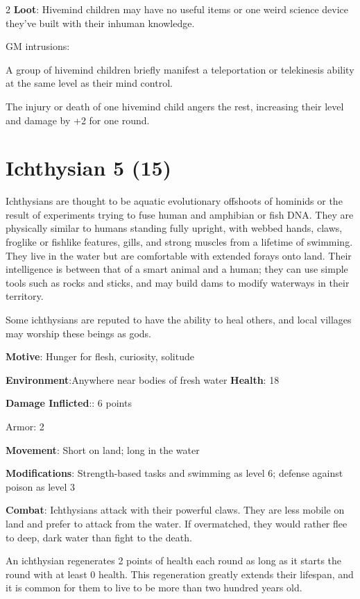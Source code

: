 \begin{multicols}{2}
\textbf{Loot}: Hivemind children may have no useful items or one weird science device they’ve built with their inhuman knowledge.

GM intrusions: 

A group of hivemind children briefly manifest a teleportation or telekinesis ability at the same level as their mind control.

The injury or death of one hivemind child angers the rest, increasing their level and damage by +2 for one round.

\section{Ichthysian 5 (15)}

Ichthysians are thought to be aquatic evolutionary offshoots of hominids or the result of experiments trying to fuse human and amphibian or fish DNA. They are physically similar to humans standing fully upright, with webbed hands, claws, froglike or fishlike features, gills, and strong muscles from a lifetime of swimming. They live in the water but are comfortable with extended forays onto land. Their intelligence is between that of a smart animal and a human; they can use simple tools such as rocks and sticks, and may build dams to modify waterways in their territory.

Some ichthysians are reputed to have the ability to heal others, and local villages may worship these beings as gods.

\textbf{Motive}: Hunger for flesh, curiosity, solitude 

\textbf{Environment}:Anywhere near bodies of fresh water \textbf{Health}: 18

\textbf{Damage Inflicted}:: 6 points

Armor: 2

\textbf{Movement}: Short on land; long in the water

\textbf{Modifications}: Strength-based tasks and swimming as level 6; defense against poison as level 3

\textbf{Combat}: Ichthysians attack with their powerful claws. They are less mobile on land and prefer to attack from the water. If overmatched, they would rather flee to deep, dark water than fight to the death.

An ichthysian regenerates 2 points of health each round as long as it starts the round with at least 0 health. This regeneration greatly extends their lifespan, and it is common for them to live to be more than two hundred years old.


\end{multicols}
